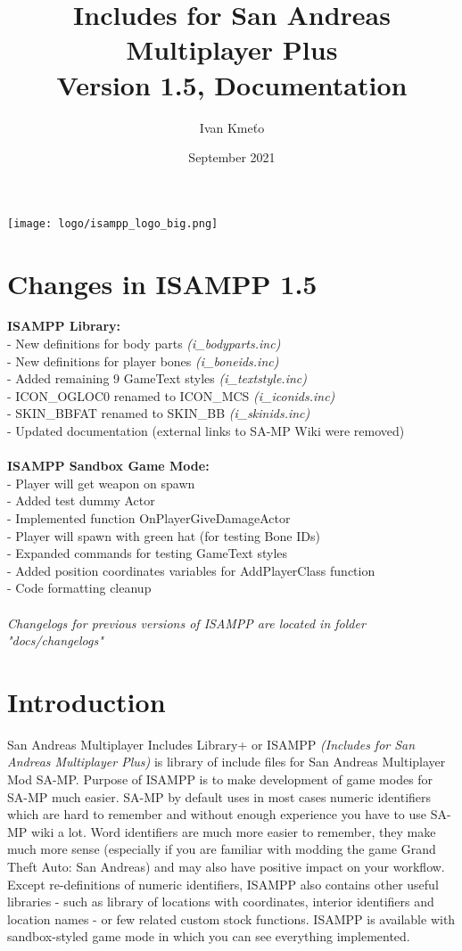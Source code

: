 \documentclass{article}
\title{Includes for San Andreas Multiplayer Plus\\Version 1.5, Documentation}
\author{Ivan Kmeťo}
\date{September 2021}
\begin{document}
\maketitle
\begin{center}
\texttt{[image: logo/isampp\_logo\_big.png]}
\end{center}

\newpage
\tableofcontents

\newpage
\section{Changes in ISAMPP 1.5}
\textbf{ISAMPP Library:}
\\- New definitions for body parts \textit{(i\_bodyparts.inc)}
\\- New definitions for player bones \textit{(i\_boneids.inc)}
\\- Added remaining 9 GameText styles \textit{(i\_textstyle.inc)}
\\- ICON\_OGLOC0 renamed to ICON\_MCS \textit{(i\_iconids.inc)}
\\- SKIN\_BBFAT renamed to SKIN\_BB \textit{(i\_skinids.inc)}
\\- Updated documentation (external links to SA-MP Wiki were removed)
\\
\\
\textbf{ISAMPP Sandbox Game Mode:}
\\- Player will get weapon on spawn
\\- Added test dummy Actor
\\- Implemented function OnPlayerGiveDamageActor
\\- Player will spawn with green hat (for testing Bone IDs)
\\- Expanded commands for testing GameText styles
\\- Added position coordinates variables for AddPlayerClass function
\\- Code formatting cleanup
\\
\\\textit{Changelogs for previous versions of ISAMPP are located in folder "docs/changelogs"}

\newpage
\section{Introduction}
San Andreas Multiplayer Includes Library+ or ISAMPP \textit{(Includes for San Andreas Multiplayer Plus)} is library of include files for San Andreas Multiplayer Mod SA-MP. Purpose of ISAMPP is to make development of game modes for SA-MP much easier. SA-MP by default uses in most cases numeric identifiers which are hard to remember and without enough experience you have to use SA-MP wiki a lot. Word identifiers are much more easier to remember, they make much more sense (especially if you are familiar with modding the game Grand Theft Auto: San Andreas) and may also have positive impact on your workflow. Except re-definitions of numeric identifiers, ISAMPP also contains other useful libraries - such as library of locations with coordinates, interior identifiers and location names - or few related custom stock functions. ISAMPP is available with sandbox-styled game mode in which you can see everything implemented.
\end{document}
